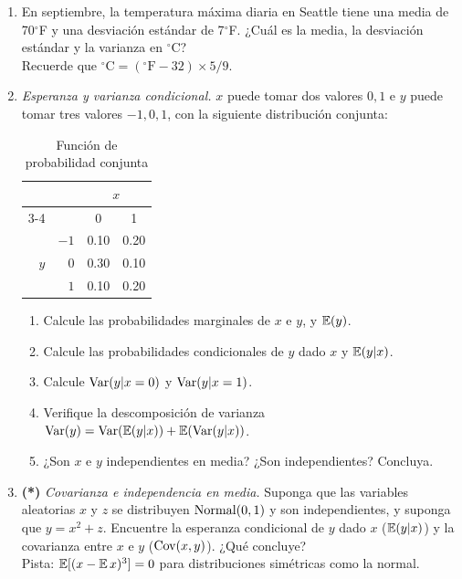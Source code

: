 \documentclass[letterpaper,11pt]{article}
\begin{document}
\begin{enumerate}[itemsep=1.2em]
\item En septiembre, la temperatura máxima diaria en Seattle tiene una media de 70$^\circ$F y
    una desviación estándar de 7$^\circ$F. ¿Cuál es la media, la desviación estándar y la
    varianza en $^\circ$C? \\
    Recuerde que $^\circ\text{C} = (^\circ\text{F} - 32)\times 5/9$.

\item \emph{Esperanza y varianza condicional.} $x$ puede tomar dos valores $0,1$ e $y$ puede
    tomar tres valores $-1,0,1$, con la siguiente distribución conjunta:
    \begin{table}[!htbp]
        \centering
        \caption{Función de probabilidad conjunta}
        \begin{tabular}{rrcc}
            \toprule
            & & \multicolumn{2}{c}{$x$} \\
            \cmidrule(lr){3-4}
            & & 0 & 1 \\
            \midrule
                & $-1$ & 0.10 & 0.20 \\
            $y$ & $0$  & 0.30 & 0.10 \\
                & $1$  & 0.10 & 0.20 \\
            \bottomrule
        \end{tabular}
    \end{table}
    \begin{enumerate}
        \item Calcule las probabilidades marginales de $x$ e $y$, y $\operatorname{\mathbb{E}}(y)$.
        \item Calcule las probabilidades condicionales de $y$ dado $x$ y $\operatorname{\mathbb{E}}(y|x)$.
        \item Calcule $\operatorname{Var}(y|x=0)$ y $\operatorname{Var}(y|x=1)$.
        \item Verifique la descomposición de varianza
              $\operatorname{Var}(y) = \operatorname{Var}(\operatorname{\mathbb{E}}(y|x)) + \operatorname{\mathbb{E}}(\operatorname{Var}(y|x))$.
        \item ¿Son $x$ e $y$ independientes en media? ¿Son independientes? Concluya.
    \end{enumerate}

\item \textbf{(*)} \emph{Covarianza e independencia en media.} Suponga que las variables aleatorias $x$ y
    $z$ se distribuyen $\operatorname{Normal}(0,1)$ y son independientes, y suponga que $y = x^2 + z$. Encuentre
    la esperanza condicional de $y$ dado $x$ ($\operatorname{\mathbb{E}}(y|x)$) y la covarianza entre $x$ e $y$
    ($\operatorname{Cov}(x,y)$). ¿Qué concluye? \\
    Pista: $\operatorname{\mathbb{E}}[(x-\operatorname{\mathbb{E}} x)^3] = 0$ para distribuciones simétricas como la normal.


\end{enumerate}
\end{document}
